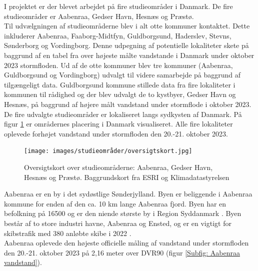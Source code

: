 
I projektet er der blevet arbejdet på fire studieområder i Danmark. De fire studieområder er Aabenraa, Gedser Havn, Hesnæs og Præstø.\\

Til udvælgningen af studieområderne blev i alt otte kommuner kontaktet. Dette inkluderer Aabenraa, Faaborg-Midtfyn, Guldborgsund, Haderslev, Stevns, Sønderborg og Vordingborg. Denne udpegning af potentielle lokaliteter skete på baggrund af en tabel fra \cite{damberg_vaerste_2023} over højeste målte vandstande i Danmark under oktober 2023 stormfloden. 
Ud af de otte kommuner blev tre kommuner (Aabenraa, Guldborgsund og Vordingborg) udvalgt til videre samarbejde på baggrund af tilgængeligt data. Guldborgsund kommune stillede data fra fire lokaliteter i kommunen til rådighed og der blev udvalgt de to kystbyer, Gedser Havn og Hesnæs, på baggrund af højere målt vandstand under stormflode i oktober 2023. \\

De fire udvalgte studieområder er lokaliseret langs sydkysten af Danmark. På figur \ref{Figur: Oversigtskort} er områdernes placering i Danmark visualiseret. Alle fire lokaliteter oplevede forhøjet vandstand under stormfloden den 20.-21. oktober 2023. 
\begin{figure}[H]
    \centering
    \texttt{[image: images/studieområder/oversigtskort.jpg]}
    \caption{Oversigtskort over studieområderne: Aabenraa, Gedser Havn, Hesnæs og Præstø. Baggrundskort fra ESRI og Klimadatastyrelsen}
    \label{Figur: Oversigtskort}
\end{figure}

Aabenraa er en by i det sydøstlige Sønderjylland. Byen er beliggende i Aabenraa kommune for enden af den ca. 10 km lange Aabenraa fjord. Byen har en befolkning på 16500 og er den niende største by i Region Syddanmark \citep{danmarks_statistisk_mobile_nodate}. Byen består af to store industri havne, Aabenraa og Ensted, og er en vigtigt for skibstrafik med 380 anløbte skibe i 2022 \citep{aabenraa_havn_aabenraa-havn-talogfakta2022_2022}.\\
Aabenraa oplevede den højeste officielle måling af vandstand under stormfloden den 20.-21. oktober 2023 på 2,16 meter over DVR90 (figur \ref{Subfig: Aabenraa vandstand}). \\

